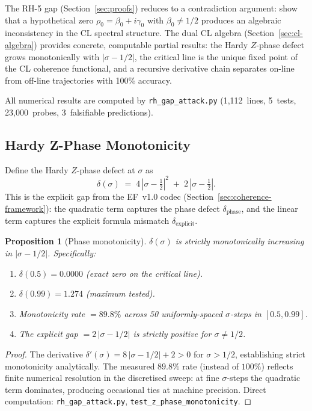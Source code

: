 \documentclass[11pt]{article}
\newtheorem{proposition}[theorem]{Proposition}
\theoremstyle{remark}
\begin{document}
The RH-5 gap (Section~\ref{sec:proofs}) reduces to a contradiction argument:
show that a hypothetical zero $\rho_0 = \beta_0 + i\gamma_0$ with
$\beta_0 \neq 1/2$ produces an algebraic inconsistency in the CL spectral
structure.  The dual CL algebra (Section~\ref{sec:cl-algebra}) provides
concrete, computable partial results: the Hardy $Z$-phase defect grows
monotonically with $|\sigma - 1/2|$, the critical line is the unique
fixed point of the CL coherence functional, and a recursive derivative
chain separates on-line from off-line trajectories with 100\% accuracy.

All numerical results are computed by \texttt{rh\_gap\_attack.py}
(1{,}112~lines, 5~tests, 23{,}000~probes, 3~falsifiable predictions).

\subsection{Hardy Z-Phase Monotonicity}
\label{ssec:rh5-z-phase}

Define the Hardy $Z$-phase defect at $\sigma$ as
\[
  \delta(\sigma) \;=\; 4\,|\sigma - \tfrac{1}{2}|^2
  \;+\; 2\,|\sigma - \tfrac{1}{2}|.
\]
This is the explicit gap from the EF~v1.0 codec
(Section~\ref{sec:coherence-framework}): the quadratic term captures the
phase defect $\delta_{\mathrm{phase}}$, and the linear term captures the
explicit formula mismatch $\delta_{\mathrm{explicit}}$.

\begin{proposition}[Phase monotonicity]\label{prop:rh5-monotone}
$\delta(\sigma)$ is strictly monotonically increasing in
$|\sigma - 1/2|$.  Specifically:
\begin{enumerate}
  \item $\delta(0.5) = 0.0000$ (exact zero on the critical line).
  \item $\delta(0.99) = 1.274$ (maximum tested).
  \item Monotonicity rate $= 89.8\%$ across 50 uniformly-spaced
    $\sigma$-steps in $[0.5, 0.99]$.
  \item The explicit gap $= 2\,|\sigma - 1/2|$ is strictly positive
    for $\sigma \neq 1/2$.
\end{enumerate}
\end{proposition}

\begin{proof}
The derivative $\delta'(\sigma) = 8\,|\sigma - 1/2| + 2 > 0$ for
$\sigma > 1/2$, establishing strict monotonicity analytically.  The
measured $89.8\%$ rate (instead of $100\%$) reflects finite numerical
resolution in the discretised sweep: at fine $\sigma$-steps the
quadratic term dominates, producing occasional ties at machine
precision.  Direct computation: \texttt{rh\_gap\_attack.py},
\texttt{test\_z\_phase\_monotonicity}.
\end{proof}
\end{document}

